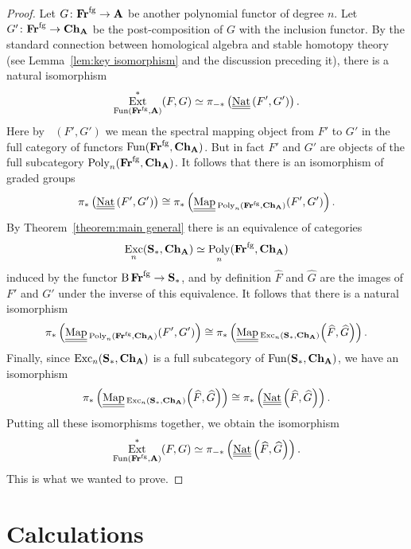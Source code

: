 \documentclass[psamsfonts]{amsart}
\theoremstyle{plain}
\theoremstyle{definition}
\theoremstyle{remark}
\newcommand{\catname}[1]{{\normalfont\textbf{#1}}}
\newcommand{\spaces}{\catname{S}_*}
\newcommand{\fr}{\allfr^{\mathrm{fg}}}
\newcommand{\allfr}{\catname{Fr}}
\newcommand{\ch}{\catname{Ch}}
\newcommand{\classifying}{\operatorname{B}}
\DeclareMathOperator{\ext}{Ext}
\DeclareMathOperator{\map}{Map}
\DeclareMathOperator{\spectralmaps}{\underline{\underline{\map}}}
\DeclareMathOperator{\nat}{Nat}
\DeclareMathOperator{\spectralNat}{\underline{\underline{\nat}}}
\DeclareMathOperator{\fun}{Fun}
\DeclareMathOperator{\poly}{Poly}
\DeclareMathOperator{\exc}{Exc}
\begin{document}
\begin{proof}
Let $G\colon \fr\to \catname{A}$ be another polynomial functor of degree $n$. Let $G'\colon \fr \to \ch_{\catname{A}}$ be the post-composition of $G$ with the inclusion functor. By the standard connection between homological algebra and stable homotopy theory (see Lemma~\ref{lem:key isomorphism} and the discussion preceding it), there is a natural isomorphism
\[
\ext^*_{\fun(\fr, \catname{A})}(F, G)\simeq \pi_{-*}\left(\spectralNat\left(F', G'\right)\right).
\]
Here by $\spectralNat\left(F', G'\right)$ we mean the spectral mapping object from $F'$ to $G'$ in the full category of functors $\fun(\fr,\ch_\catname{A})$. But in fact $F'$ and $G'$  are objects of the full subcategory $\poly_n(\fr, \ch_\catname{A})$. It follows that there is an isomorphism of graded groups
\[
 \pi_{*}\left(\spectralNat\left(F', G'\right)\right)\cong  \pi_{*}\left(\spectralmaps\hphantom{.}_{ \!\!\poly_n(\fr, \ch_\catname{A})}\!\left(F', G'\right)\right).
\]
By Theorem~\ref{theorem:main general} there is an equivalence of categories 
\[
\exc_n(\spaces, \ch_{\catname{A}})\simeq  \poly_n(\fr, \ch_\catname{A})
\]
induced by the functor $\classifying \fr \to \spaces$, and by definition $\widehat F$ and $\widehat G$ are the images of $F'$ and $G'$ under the inverse of this equivalence. It follows that there is a natural isomorphism 
\[
 \pi_{*}\left(\spectralmaps\hphantom{.}_{ \!\!\poly_n(\fr, \ch_\catname{A})}\!\left(F', G'\right)\right)\cong  \pi_{*}\left(\spectralmaps\hphantom{.}_{ \!\!\exc_n(\spaces, \ch_\catname{A})}\!\left(\widehat F, \widehat G\right)\right).
\]
Finally, since $\exc_n(\spaces, \ch_{\catname{A}})$ is a full subcategory of $\fun(\spaces, \ch_{\catname{A}})$, we have an isomorphism
\[
 \pi_{*}\left(\spectralmaps\hphantom{.}_{ \!\!\exc_n(\spaces, \ch_\catname{A})}\!\left(\widehat F, \widehat G\right)\right)\cong  \pi_{*}\left(\spectralNat\left(\widehat F, \widehat G\right)\right).
\]
Putting all these isomorphisms together, we obtain the isomorphism
\[
\ext^*_{\fun(\fr, \catname{A})}(F, G)\simeq \pi_{-*}\left(\spectralNat\left(\widehat F, \widehat G\right)\right).
\]
This is what we wanted to prove.
\end{proof}

\part{Calculations} \label{part:calculations}
\end{document}
